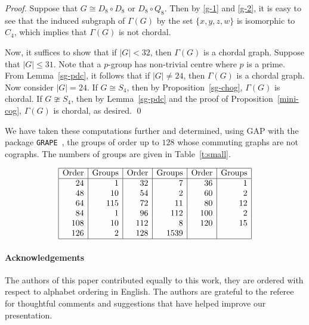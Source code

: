 \documentclass{elsarticle}
\begin{document}
\begin{proof}
Suppose that $G\cong D_8\circ D_8$ or $D_8\circ Q_8$. Then by \eqref{g-1} and
\eqref{g-2}, it is easy to see that the induced subgraph of
$\Gamma(G)$ by the set $\{x,y,z,w\}$
is isomorphic to $C_4$, which implies that $\Gamma(G)$ is not chordal.

Now, it suffices to show that if $|G|<32$, then $\Gamma(G)$ is a chordal graph. Suppose that $|G|\le 31$.
Note that a $p$-group has non-trivial centre where $p$ is a prime. From Lemma~\ref{sg-pdc}, it follows that if $|G|\ne 24$, then $\Gamma(G)$ is a chordal graph. Now consider $|G|= 24$.
If $G\cong S_4$, then by Proposition~\ref{sg-chog}, $\Gamma(G)$ is chordal. If $G\ncong S_4$, then by Lemma~\ref{sg-pdc} and the proof of Proposition~\ref{mini-cog}, $\Gamma(G)$ is chordal, as desired. \qed
\end{proof}

We have taken these computations further and determined, using \textsf{GAP} with
the package \texttt{GRAPE}~\cite{grape}, the groups of order up to $128$ whose
commuting graphs are not cographs. The numbers of groups are given in
Table~\ref{t:small}.

\begin{table}[htbp]
\caption{\label{t:small}Small groups whose commuting graph is not a cograph}
\[\tabcolsep=10pt
\begin{array}{|r|r|r|r|r|r|}
\hline
\hbox{Order} & \hbox{Groups}& \hbox{Order} & \hbox{Groups} & \hbox{Order} & \hbox{Groups}\\\hline
24 & 1 & 32 & 7 & 36 & 1 \\

48 & 10 & 54 & 2 & 60 & 2 \\

64 & 115 & 72 & 11 & 80 & 12 \\

84 & 1 & 96 & 112 & 100 & 2 \\

108 & 10 & 112 & 8 & 120 & 15 \\

126 & 2 & 128 & 1539 & & \\ \hline
\end{array}
\]
\end{table}






\paragraph{Acknowledgements}
The authors of this paper contributed equally to this work, they are ordered with respect to alphabet ordering in English.  The authors are grateful to the referee for thoughtful comments and suggestions that have helped improve our presentation.
\end{document}
